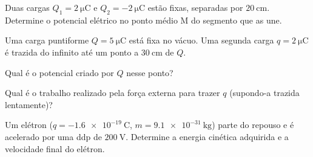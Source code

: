 \blocoaprofundamento
\begin{questao}[3]{}

Duas cargas $Q_1 = \SI{+2}{\micro\coulomb}$ e $Q_2 = \SI{-2}{\micro\coulomb}$
estão fixas, separadas por $\SI{20}{\centi\meter}$. Determine o potencial elétrico
no ponto médio M do segmento que as une.


\end{questao}
\begin{questao}[3]{}

Uma carga puntiforme $Q = \SI{+5}{\micro\coulomb}$ está fixa no vácuo. Uma segunda
carga $q = \SI{+2}{\micro\coulomb}$ é trazida do infinito até um ponto a
$\SI{30}{\centi\meter}$ de $Q$.
\begin{itensq}
\item Qual é o potencial criado por $Q$ nesse ponto?
\item Qual é o trabalho realizado pela força externa para trazer $q$ (supondo-a
      trazida lentamente)?
\end{itensq}


\end{questao}
\begin{questao}[3]{}

Um elétron ($q = \SI{-1.6e-19}{\coulomb}$, $m = \SI{9.1e-31}{\kilogram}$) parte do
repouso e é acelerado por uma ddp de $\SI{200}{\volt}$. Determine a energia
cinética adquirida e a velocidade final do elétron.


\end{questao}
